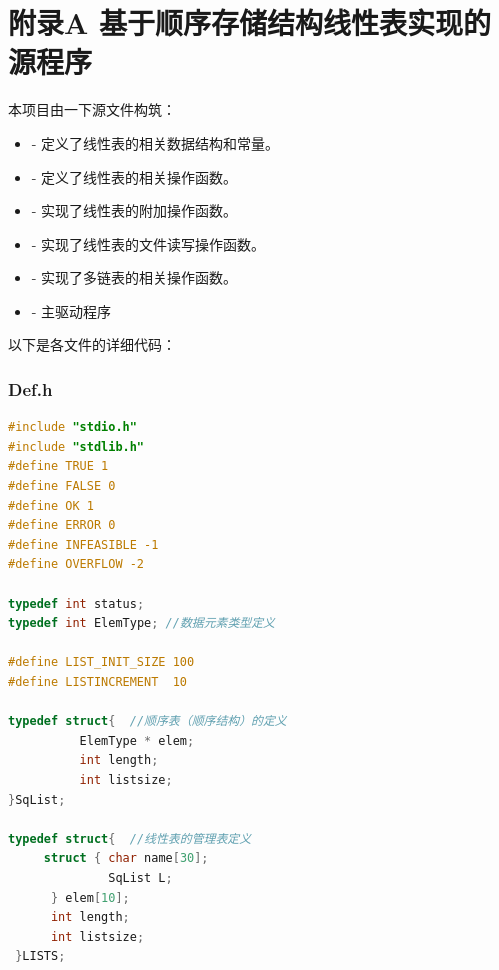 \documentclass[supercite]{Experimental_Report}
\theoremstyle{definition}
\begin{document}
\nocite{*} %



\setcounter{secnumdepth}{0}
\appendix

\section{附录A 基于顺序存储结构线性表实现的源程序}

本项目由一下源文件构筑：

\begin{itemize}
	\item {} - 定义了线性表的相关数据结构和常量。
	\item {} - 定义了线性表的相关操作函数。
	\item {} - 实现了线性表的附加操作函数。
	\item {} - 实现了线性表的文件读写操作函数。
	\item {} - 实现了多链表的相关操作函数。
	\item {} - 主驱动程序
\end{itemize}

以下是各文件的详细代码：

\subsubsection*{Def.h}
\begin{lstlisting}[language=C, caption={Def.h}, label=lst:def_h]
#include "stdio.h"
#include "stdlib.h"
#define TRUE 1
#define FALSE 0
#define OK 1
#define ERROR 0
#define INFEASIBLE -1
#define OVERFLOW -2

typedef int status;
typedef int ElemType; //数据元素类型定义

#define LIST_INIT_SIZE 100
#define LISTINCREMENT  10

typedef struct{  //顺序表（顺序结构）的定义
	      ElemType * elem;
	      int length;
	      int listsize;
}SqList;

typedef struct{  //线性表的管理表定义
     struct { char name[30];
     		  SqList L;	
      } elem[10];
      int length;
      int listsize;
 }LISTS;
\end{lstlisting}
\end{document}
